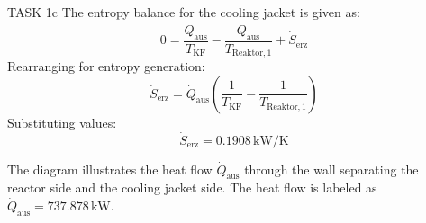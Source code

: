 TASK 1c  
The entropy balance for the cooling jacket is given as:  
\[
0 = \frac{\dot{Q}_{\text{aus}}}{T_{\text{KF}}} - \frac{\dot{Q}_{\text{aus}}}{T_{\text{Reaktor},1}} + \dot{S}_{\text{erz}}
\]  
Rearranging for entropy generation:  
\[
\dot{S}_{\text{erz}} = \dot{Q}_{\text{aus}} \left( \frac{1}{T_{\text{KF}}} - \frac{1}{T_{\text{Reaktor},1}} \right)
\]  
Substituting values:  
\[
\dot{S}_{\text{erz}} = 0.1908 \, \text{kW/K}
\]  

The diagram illustrates the heat flow \( \dot{Q}_{\text{aus}} \) through the wall separating the reactor side and the cooling jacket side. The heat flow is labeled as \( \dot{Q}_{\text{aus}} = 737.878 \, \text{kW} \).